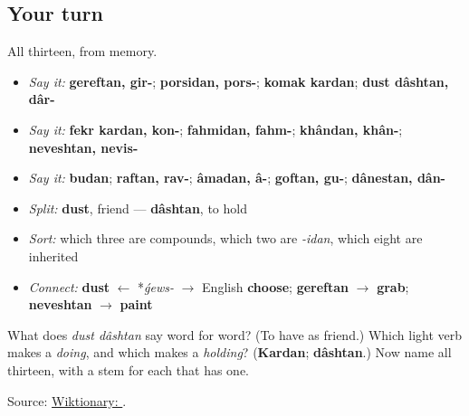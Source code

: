 \subsection*{Your turn}
All thirteen, from memory.

\begin{itemize}
\raggedright
  \item \emph{Say it:} \textbf{gereftan, gir-}; \textbf{porsidan, pors-}; \textbf{komak kardan}; \textbf{dust dâshtan, dâr-}
  \item \emph{Say it:} \textbf{fekr kardan, kon-}; \textbf{fahmidan, fahm-}; \textbf{khândan, khân-}; \textbf{neveshtan, nevis-}
  \item \emph{Say it:} \textbf{budan}; \textbf{raftan, rav-}; \textbf{âmadan, â-}; \textbf{goftan, gu-}; \textbf{dânestan, dân-}
  \item \emph{Split:} \textbf{dust}, friend — \textbf{dâshtan}, to hold
  \item \emph{Sort:} which three are compounds, which two are \emph{-idan}, which eight are inherited
  \item \emph{Connect:} \textbf{dust} $\leftarrow$ *\emph{ǵews-} $\to$ English \textbf{choose}; \textbf{gereftan} $\to$ \textbf{grab}; \textbf{neveshtan} $\to$ \textbf{paint}
\end{itemize}

\begin{tcolorbox}[breakable,colback=teal!4,colframe=teal!35!black,title={Before you move on}]
What does \emph{dust dâshtan} say word for word? (To have as friend.) Which light verb makes a \emph{doing}, and which makes a \emph{holding}? (\textbf{Kardan}; \textbf{dâshtan}.) Now name all thirteen, with a stem for each that has one.

Source: \href{https://en.wiktionary.org/wiki/\%D8\%AF\%D9\%88\%D8\%B3\%D8\%AA\_\%D8\%AF\%D8\%A7\%D8\%B4\%D8\%AA\%D9\%86}{Wiktionary:  }.
\end{tcolorbox}
